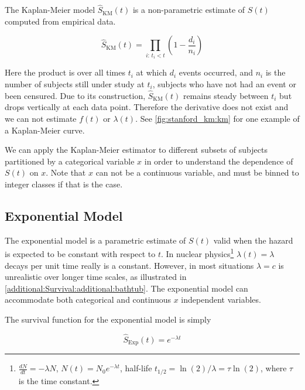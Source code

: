 The Kaplan-Meier model \cite{km} $\hat{S}_{\text{KM}}\left(t\right)$ is a non-parametric
estimate of $S\left(t\right)$ computed from empirical data.

\begin{equation}\label{eq:Survival:km}
\hat{S}_{\text{KM}}\left(t\right) = \prod_{i:\,t_{i} < t} \left(1 - \frac{d_{i}}{n_{i}}\right)
\end{equation}

\noindent Here the product is over all times $t_{i}$ at which $d_{i}$ events occurred,
and $n_{i}$ is the number of subjects still under study at $t_{i}$,
\ie subjects who have not had an event or been censured.
Due to its construction, $\hat{S}_{\text{KM}}\left(t\right)$ remains steady
between $t_{i}$ but drops vertically at each data point.
Therefore the derivative does not exist and we can not estimate $f\left(t\right)$ or $\lambda\left(t\right)$.
See \cref{fig:stanford_km:km} for one example of a Kaplan-Meier curve.

We can apply the Kaplan-Meier estimator to different subsets of subjects partitioned by a categorical variable $x$
in order to understand the dependence of $S\left(t\right)$ on $x$.
Note that $x$ can not be a continuous variable, and must be binned to integer classes if that is the case.

\subsection{Exponential Model}
\label{additional:Survival:exp}

The exponential model is a parametric estimate of $S\left(t\right)$
valid when the hazard is expected to be constant with respect to $t$.
In nuclear physics\footnote{$\frac{dN}{dt} = -\lambda N$, $N\left(t\right) = N_{0} e^{-\lambda t}$, half-life $t_{1/2} = \ln\left(2\right) / \lambda = \tau \ln\left(2\right)$, where $\tau$ is the time constant.} $\lambda\left(t\right) = \lambda$
decays per unit time really is a constant.
However, in most situations $\lambda = c$ is unrealistic over longer time scales,
as illustrated in \cref{additional:Survival:additional:bathtub}.
The exponential model can accommodate both categorical and continuous $x$ independent variables.

The survival function for the exponential model is simply

\begin{equation}\label{eq:Survival:exp}
\hat{S}_{\text{Exp}}\left(t\right) = e^{-\lambda t}
\end{equation}

